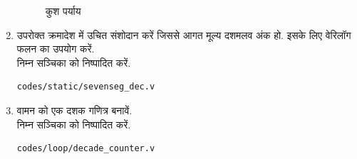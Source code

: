 \documentclass[journal,12pt,twocolumn]{IEEEtran}
\renewcommand\thesection{\arabic{section}}
\begin{document}
\begin{enumerate}[label=\thesection.\arabic*.,ref=\thesection.\theenumi]
\begin{figure}[!ht]
\caption{कुश पर्याय}
\label{fig:pins}
\end{figure}
\item उपरोक्त क्रमादेश में उचित संशोदान करें जिससे आगत मूल्य दशमलव अंक  हो. इसके लिए वेरिलॉग फलन का उपयोग करें.
\\
\solution  निम्न सञ्चिका को निष्पादित करें.
\begin{lstlisting}
codes/static/sevenseg_dec.v
\end{lstlisting}
\item वामन को एक दशक गणित्र बनावें.
\\
\solution निम्न सञ्चिका को निष्पादित करें.
\begin{lstlisting}
codes/loop/decade_counter.v
\end{lstlisting}
\end{enumerate}
%
\end{document}
